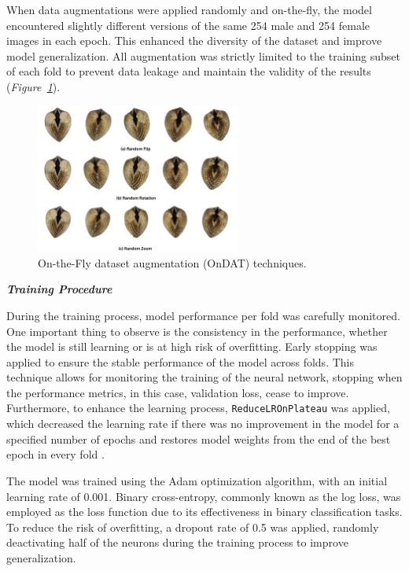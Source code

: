 When data augmentations were applied randomly and on-the-fly, the model encountered slightly different versions of the same 254 male and 254 female images in each epoch. This enhanced the diversity of the dataset and improve model generalization. All augmentation was strictly limited to the training subset of each fold to prevent data leakage and maintain the validity of the results (\textit{Figure~\ref{fig:data_augmentation}}).

\begin{figure}[h]
	\centering
	\includegraphics[width=0.6\textwidth]{figures/data_augmentation.png}
	\caption{ On-the-Fly dataset augmentation (OnDAT) techniques.}
	\label{fig:data_augmentation}
\end{figure}

\newpage
\textbf{\textit{Training Procedure}}

During the training process, model performance per fold was carefully monitored. One important thing to observe is the consistency in the performance, whether the model is still learning or is at high risk of overfitting. Early stopping was applied to ensure the stable performance of the model across folds. This technique allows for monitoring the training of the neural network, stopping when the performance metrics, in this case, validation loss, cease to improve. Furthermore, to enhance the learning process, \texttt{ReduceLROnPlateau} was applied, which decreased the learning rate if there was no improvement in the model for a specified number of epochs and restores model weights from the end of the best epoch in every fold \cite{kerasTeam}.

The model was trained using the Adam optimization algorithm, with an initial learning rate of 0.001. Binary cross-entropy, commonly known as the log loss, was employed as the loss function due to its effectiveness in binary classification tasks. To reduce the risk of overfitting, a dropout rate of 0.5 was applied, randomly deactivating half of the neurons during the training process to improve generalization.


